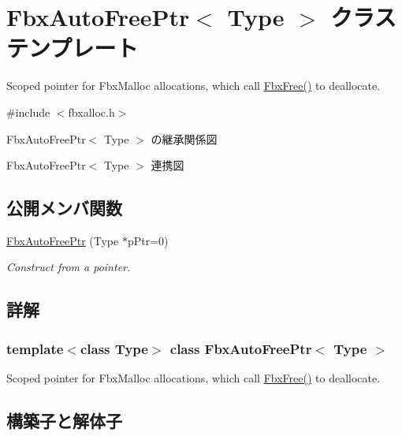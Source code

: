 \hypertarget{class_fbx_auto_free_ptr}{}\section{Fbx\+Auto\+Free\+Ptr$<$ Type $>$ クラステンプレート}
\label{class_fbx_auto_free_ptr}


Scoped pointer for Fbx\+Malloc allocations, which call \hyperlink{fbxalloc_8h_a8252906713d55f4c56e7ba84221d3852}{Fbx\+Free()} to deallocate.  




{\ttfamily \#include $<$fbxalloc.\+h$>$}



Fbx\+Auto\+Free\+Ptr$<$ Type $>$ の継承関係図


Fbx\+Auto\+Free\+Ptr$<$ Type $>$ 連携図
\subsection*{公開メンバ関数}
\begin{DoxyCompactItemize}
\item 
\hyperlink{class_fbx_auto_free_ptr_a02473c8a84df8d8fb6803a2d4224819d}{Fbx\+Auto\+Free\+Ptr} (Type $\ast$p\+Ptr=0)
\begin{DoxyCompactList}\small\item\em Construct from a pointer. \end{DoxyCompactList}\end{DoxyCompactItemize}


\subsection{詳解}
\subsubsection*{template$<$class Type$>$\newline
class Fbx\+Auto\+Free\+Ptr$<$ Type $>$}

Scoped pointer for Fbx\+Malloc allocations, which call \hyperlink{fbxalloc_8h_a8252906713d55f4c56e7ba84221d3852}{Fbx\+Free()} to deallocate. 

\subsection{構築子と解体子}
\mbox{\label{class_fbx_auto_free_ptr_a02473c8a84df8d8fb6803a2d4224819d}} 

